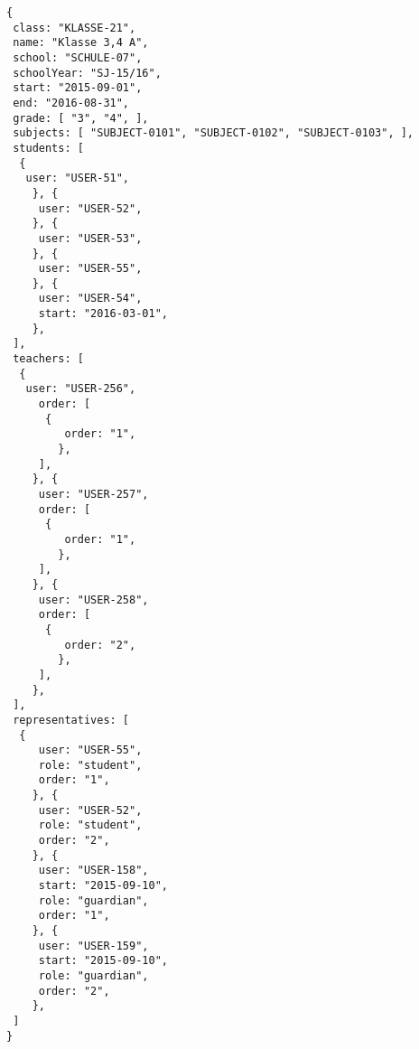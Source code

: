 
\begin{lstlisting}[caption={Klassen-Datenmodell Beispiel 3: Jahrgangsübergreifende Klasse},frame=tlrb]
{
 class: "KLASSE-21",
 name: "Klasse 3,4 A",
 school: "SCHULE-07",
 schoolYear: "SJ-15/16",
 start: "2015-09-01",
 end: "2016-08-31",
 grade: [ "3", "4", ],
 subjects: [ "SUBJECT-0101", "SUBJECT-0102", "SUBJECT-0103", ],
 students: [
  { 
   user: "USER-51",
	}, { 
	 user: "USER-52",
	}, { 
	 user: "USER-53",
	}, { 
	 user: "USER-55",
	}, { 
	 user: "USER-54",
	 start: "2016-03-01",
	},
 ],
 teachers: [
  { 
   user: "USER-256",
	 order: [
	  {
		 order: "1",
		},
	 ],
	}, { 
	 user: "USER-257",
	 order: [
	  {
		 order: "1",
		},
	 ],
	}, { 
	 user: "USER-258",
	 order: [
	  {
		 order: "2",
		},
	 ],
	},
 ],
 representatives: [
  {
	 user: "USER-55",
	 role: "student",
	 order: "1",	 
	}, {
	 user: "USER-52",
	 role: "student",
	 order: "2",	 
	}, {
	 user: "USER-158",
	 start: "2015-09-10",
	 role: "guardian",
	 order: "1",	 
	}, {
	 user: "USER-159",
	 start: "2015-09-10",
	 role: "guardian",
	 order: "2",	 
	},  
 ]
}
\end{lstlisting}
